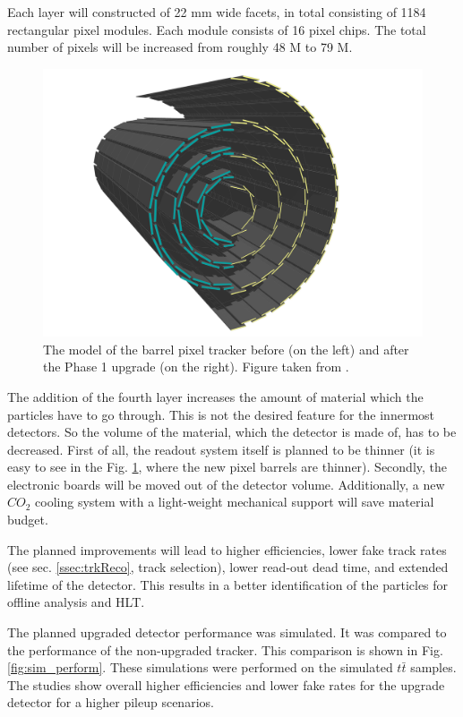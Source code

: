 Each layer will constructed of 22 mm wide facets, in total consisting of 1184 rectangular pixel modules. Each module
consists of 16 pixel chips. The total number of pixels will be increased from roughly 48 M to 79 M.

\begin{figure}[t]
 \centering
 \includegraphics[width=1.0\textwidth]{021_pixel_upgrade/plots/pixel_phase1_4_layers.png}
 \caption{The model of the barrel pixel tracker before (on the left) and after the Phase 1 upgrade (on the right). Figure taken from
 \cite{CMS:2012sda}.}
 \label{fig:tracker_4}
\end{figure}

The addition of the fourth layer increases the amount of material which the particles have to go through. This is not
the desired feature for the innermost detectors. So the volume of the material, which the detector is made of, has to be decreased. 
First of all, the readout system itself is planned to be thinner (it is easy to see in the Fig. \ref{fig:tracker_4},
where the new pixel barrels are thinner). Secondly, the electronic boards will be moved out of the detector volume. 
Additionally, a new $CO_{2}$ cooling system \cite{CMS:2012sda} with a light-weight mechanical support will save material budget.

The planned improvements will lead to higher efficiencies, lower fake track rates (see sec. \ref{ssec:trkReco}, track selection), lower read-out dead time,
and extended lifetime of the detector. This results in a better identification of the particles for offline analysis and HLT.

The planned upgraded detector performance was simulated. It was compared to the performance of the non-upgraded tracker. This comparison
is shown in Fig. \ref{fig:sim_perform}. These simulations were performed on the simulated $t\bar{t}$ samples. The studies show overall higher 
efficiencies and lower fake rates for the upgrade detector for a higher pileup scenarios.

